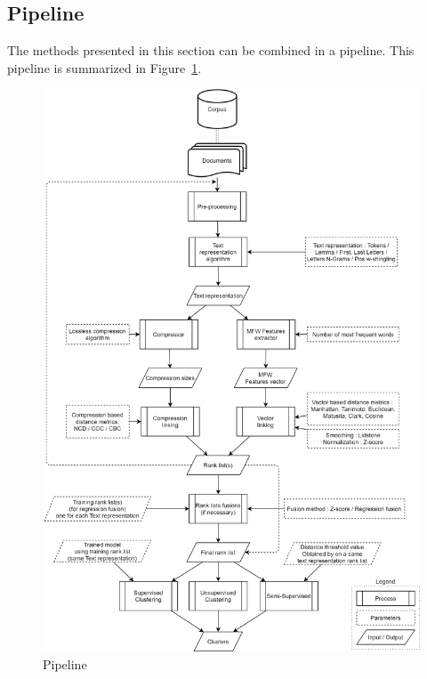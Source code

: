 \subsection{Pipeline}

The methods presented in this section can be combined in a pipeline.
This pipeline is summarized in Figure~\ref{fig:pipeline}.

\onecolumn
\begin{figure}[p]
  \centering
  \caption{Pipeline}
  \label{fig:pipeline}
  \includegraphics[width=\textwidth,height=\textheight,keepaspectratio]{img/pipeline.png}
\end{figure}
\twocolumn
